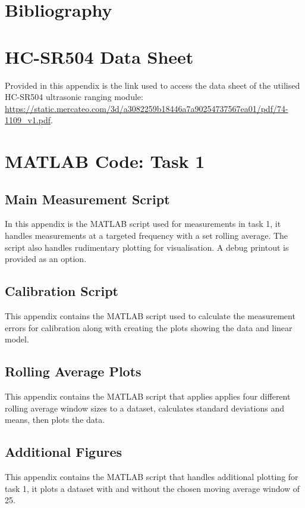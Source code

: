 \documentclass[a4paper,12pt]{article}
\begin{document}
\section{Bibliography}
\newrefcontext[sorting=nyt]
\printbibliography[heading=none]

\appendix
\section{HC-SR504 Data Sheet}
\label{trusens}
Provided in this appendix is the link used to access the data sheet of the utilised HC-SR504 ultrasonic ranging module:
\url{https://static.mercateo.com/3d/a3082259b18446a7a90254737567ea01/pdf/74-1109_v1.pdf}.

\section{MATLAB Code: Task 1}
\label{appendix:A1}
\subsection{Main Measurement Script}
In this appendix is the MATLAB script used for measurements in task 1, it handles measurements at a targeted frequency with a set rolling average. The script also handles rudimentary plotting for visualisation. A debug printout is provided as an option.

\subsection{Calibration Script}
\label{appendix:A2}
This appendix contains the MATLAB script used to calculate the measurement errors for calibration along with creating the plots showing the data and linear model.

\subsection{Rolling Average Plots}
This appendix contains the MATLAB script that applies applies four different rolling average window sizes to a dataset, calculates standard deviations and means, then plots the data.

\label{rollingAvgPlots.m}
\subsection{Additional Figures}
This appendix contains the MATLAB script that handles additional plotting for task 1, it plots a dataset with and without the chosen moving average window of 25.

\end{document}
